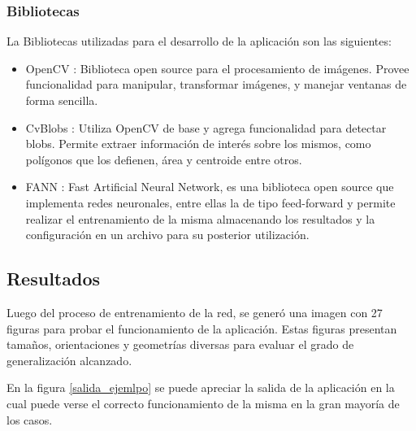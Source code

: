 \documentclass[pdftex,a4paper,10.5pt]{article}
\begin{document}
\subsubsection{Bibliotecas}
La Bibliotecas utilizadas para el desarrollo de la aplicaci\'on son las
siguientes:
\begin{itemize}
	\item	OpenCV \cite{openCV,openCVBook} : Biblioteca open source para el procesamiento de im\'agenes.
	Provee funcionalidad para manipular, transformar im\'agenes, y manejar ventanas de forma sencilla.
	\item	CvBlobs \cite{cvBlob}: Utiliza OpenCV de base y agrega funcionalidad para
	detectar blobs. Permite extraer informaci\'on de inter\'es sobre los mismos, como pol\'igonos que los 
	defienen, \'area y centroide entre otros.
	\item	FANN \cite{fann}: Fast Artificial Neural Network, es una biblioteca open source
	que implementa redes neuronales, entre ellas la de tipo feed-forward y permite realizar el entrenamiento      	de la misma almacenando los resultados y la configuraci\'on en un archivo para su posterior
	utilizaci\'on.
\end{itemize}
       

\subsection{Resultados} %

Luego del proceso de entrenamiento de la red, se gener\'o una imagen con 27 figuras para probar el funcionamiento de la aplicaci\'on. Estas figuras presentan tama\~nos, orientaciones y geometr\'ias diversas para evaluar el grado de generalizaci\'on alcanzado.

En la figura \ref{salida_ejemlpo} se puede apreciar la salida de la aplicaci\'on en la cual puede verse el correcto funcionamiento de la misma en la gran mayor\'ia de los casos.
\end{document}
